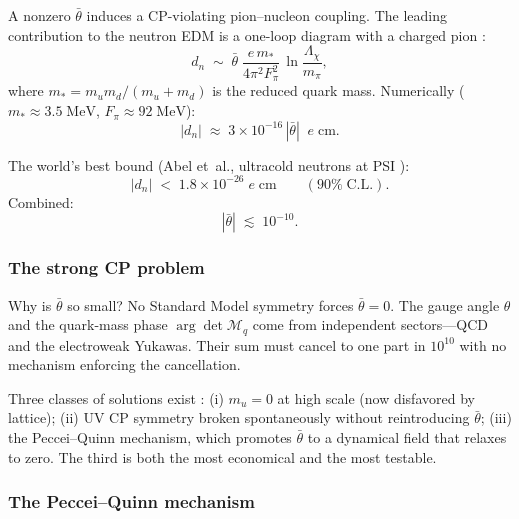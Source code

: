 A nonzero $\bar\theta$ induces a CP-violating pion--nucleon coupling.  The leading contribution to the neutron EDM is a one-loop diagram with a charged pion \cite{Hook2018TASIStrongCPAxions}:
\begin{equation}\label{eq:nEDM-estimate}
  d_n \;\sim\; \bar\theta\;\frac{e\, m_*}{4\pi^2 F_\pi^2}\,\ln\!\frac{\Lambda_\chi}{m_\pi},
\end{equation}
where $m_* = m_u m_d/(m_u + m_d)$ is the reduced quark mass.  Numerically ($m_*\approx 3.5\;\mathrm{MeV}$, $F_\pi\approx 92\;\mathrm{MeV}$):
\begin{equation}\label{eq:nEDM-numerical}
  |d_n| \;\approx\; 3\times 10^{-16}\,|\bar\theta|\;\;e\;\mathrm{cm}.
\end{equation}

The world's best bound (Abel et~al., ultracold neutrons at PSI \cite{Abel2020NeutronEDM}):
\begin{equation}\label{eq:nEDM-bound}
  |d_n| \;<\; 1.8\times 10^{-26}\;e\;\mathrm{cm} \qquad (90\%\;\text{C.L.}).
\end{equation}
Combined:
\begin{equation}\label{eq:bar-theta-bound}
  |\bar\theta| \;\lesssim\; 10^{-10}.
\end{equation}

\subsubsection{The strong CP problem}

Why is $\bar\theta$ so small?  No Standard Model symmetry forces $\bar\theta=0$.  The gauge angle $\theta$ and the quark-mass phase $\arg\det\mathcal{M}_q$ come from independent sectors---QCD and the electroweak Yukawas.  Their sum must cancel to one part in $10^{10}$ with no mechanism enforcing the cancellation.

Three classes of solutions exist \cite{Dine2000TASIStrongCP,Hook2018TASIStrongCPAxions}: (i) $m_u=0$ at high scale (now disfavored by lattice); (ii) UV CP symmetry broken spontaneously without reintroducing $\bar\theta$; (iii) the Peccei--Quinn mechanism, which promotes $\bar\theta$ to a dynamical field that relaxes to zero.  The third is both the most economical and the most testable.

\subsubsection{The Peccei--Quinn mechanism}

